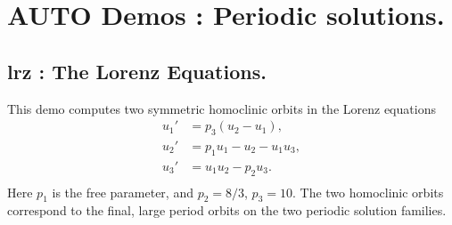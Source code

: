 \documentclass[12pt]{report}
\begin{document}
\chapter{ {\cal AUTO} Demos : Periodic solutions.} \label{ch:Demos_Periodic}

\newpage
\section{ lrz : The Lorenz Equations.} \label{sec:Demos_lrz}
This demo computes two symmetric homoclinic orbits in the Lorenz equations
\begin{equation} \begin{array}{cl}
  u_1' &=  p_3 (u_2 - u_1), \\
  u_2' &=  p_1 u_1 - u_2 - u_1 u_3,  \\
  u_3' &=  u_1 u_2 - p_2 u_3. \\ \end{array} \end{equation}
Here $p_1$ is the free parameter, and $p_2=8/3$, $p_3=10$.
The two homoclinic orbits correspond to the final, large period orbits 
on the two periodic solution families.
\end{document}
